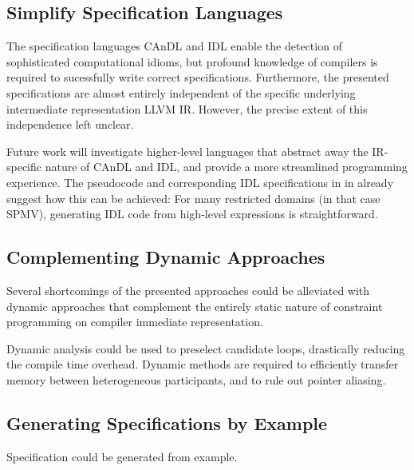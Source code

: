 \subsection{Simplify Specification Languages}

    The specification languages CAnDL and IDL enable the detection of
    sophisticated computational idioms, but profound knowledge of compilers is
    required to sucessfully write correct specifications. 
    Furthermore, the presented specifications are almost entirely independent of
    the specific underlying intermediate representation LLVM IR.
    However, the precise extent of this independence left unclear.

    Future work will investigate higher-level languages that abstract away the
    IR-specific nature of CAnDL and IDL, and provide a more streamlined
    programming experience.
    The pseudocode and corresponding IDL specifications in
     in  already
    suggest how this can be achieved:
    For many restricted domains (in that case SPMV), generating IDL code from
    high-level expressions is straightforward.

\subsection{Complementing Dynamic Approaches}

    Several shortcomings of the presented approaches could be alleviated with
    dynamic approaches that complement the entirely static nature of constraint
    programming on compiler immediate representation.

    Dynamic analysis could be used to preselect candidate loops, drastically
    reducing the compile time overhead.
    Dynamic methods are required to efficiently transfer memory between
    heterogeneous participants, and to rule out pointer aliasing.

\subsection{Generating Specifications by Example}

    Specification could be generated from example.
